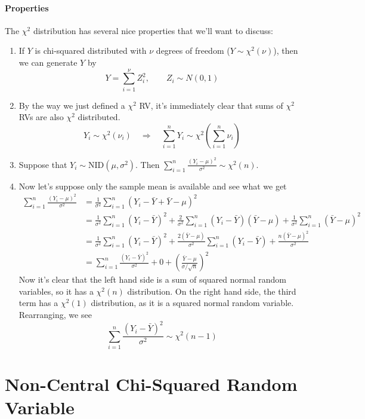 \documentclass[a4paper,12pt]{scrartcl}
\begin{document}
\paragraph{Properties}
The $\chi^2$ distribution has several nice properties that we'll
want to discuss:
\begin{enumerate}
   \item If $Y$ is chi-squared distributed with $\nu$ degrees of
      freedom ($Y\sim \chi^2(\nu)$), then we can generate $Y$ by
	 \[ Y = \sum^\nu_{i=1} Z^2_i, \qquad
	    Z_i \sim N(0,1)\]
   \item By the way we just defined a $\chi^2$ RV, it's immediately
      clear that sums of $\chi^2$ RVs are also $\chi^2$ distributed.
	 \[ Y_i \sim \chi^2(\nu_i) \quad \Rightarrow \quad
	    \sum^n_{i=1} Y_i \sim \chi^2\left(\sum^n_{i=1} \nu_i \right)
	    \]
   \item Suppose that $Y_i \sim \text{NID}(\mu,\sigma^2)$. Then 
       $\sum^n_{i=1} \frac{(Y_i-\mu)^2}{\sigma^2}  \sim \chi^2(n)$.
   \item Now let's suppose only the sample mean is available and
      see what we get
      \begin{align*}
	 \sum^n_{i=1} \frac{(Y_i-\mu)^2}{\sigma^2} &= \frac{1}{
	    \sigma^2} \sum^n_{i=1} (Y_i - \bar{Y}+ \bar{Y}-\mu)^2 \\
	    &= \frac{1}{\sigma^2} \sum^n_{i=1}  (Y_i - \bar{Y})^2
	    + \frac{2}{\sigma^2} \sum^n_{i=1} (Y_i-\bar{Y})(\bar{Y}-\mu)
	    + \frac{1}{\sigma^2} \sum^n_{i=1} (\bar{Y}-\mu)^2 \\
	    &= \frac{1}{\sigma^2} \sum^n_{i=1}  (Y_i - \bar{Y})^2 
	    + \frac{2(\bar{Y}-\mu)}{\sigma^2} \sum^n_{i=1} (Y_i-\bar{Y})
	    + \frac{n(\bar{Y}-\mu)^2 }{\sigma^2}  \\
	 &= \sum^n_{i=1}\frac{(Y_i - \bar{Y})^2 }{\sigma^2} + 0 +
	    \left(\frac{\bar{Y}-\mu }{\sigma /\sqrt{n}}\right)^2
      \end{align*}
      Now it's clear that the left hand side is a sum of squared normal
      random variables, so it has a $\chi^2(n)$ distribution. On
      the right hand side, the third term has a $\chi^2(1)$
      distribution, as it is a squared normal random variable. 
      Rearranging, we see
      \[ \sum^n_{i=1}\frac{(Y_i - \bar{Y})^2 }{\sigma^2}  \sim
	    \chi^2(n-1) \]
\end{enumerate}

\section{Non-Central Chi-Squared Random Variable}









\end{document}
